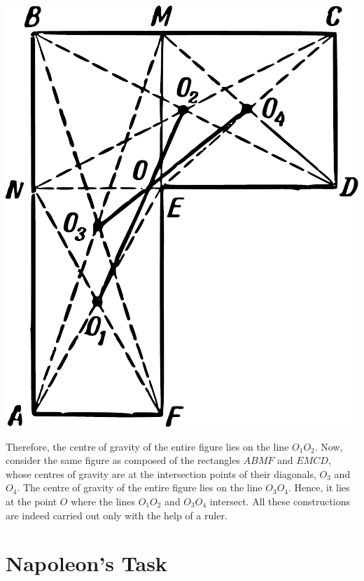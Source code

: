\begin{marginfigure}%
\centering
\includegraphics[width=\textwidth]{figures/ch-10/fig-144.pdf}
\end{marginfigure}


Therefore, the centre of gravity of the entire figure lies on the line $O_{1}O_{2}$. Now, consider the same figure as composed of the rectangles $ABMF$ and $EMCD$, whose centres of gravity are at the intersection points of their diagonals, $O_{3}$ and $O_{4}$. The centre of gravity of the entire figure lies on the line $O_{3}O_{4}$. Hence, it lies at the point $O$ where the lines $O_{1}O_{2}$ and $O_{3}O_{4}$ intersect. All these constructions are indeed carried out only with the help of a ruler.






\section{Napoleon's Task}
\label{sec-10.3}


